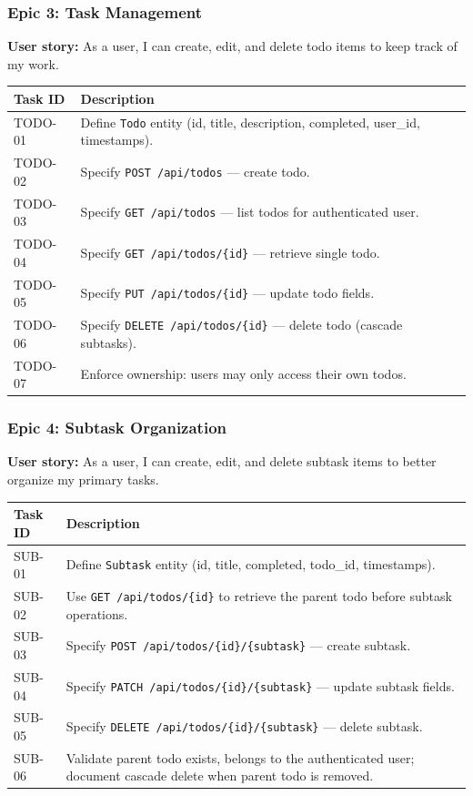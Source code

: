\subsubsection{Epic 3: Task Management}
\textbf{User story:} As a user, I can create, edit, and delete todo items to keep track of my work.

\begin{tabularx}{\textwidth}{@{} p{2.4cm} X @{}}
\toprule
\textbf{Task ID} & \textbf{Description} \\
\midrule
TODO-01 & Define \texttt{Todo} entity (id, title, description, completed, user\_id, timestamps). \\
TODO-02 & Specify \texttt{POST /api/todos} --- create todo. \\
TODO-03 & Specify \texttt{GET /api/todos} --- list todos for authenticated user. \\
TODO-04 & Specify \texttt{GET /api/todos/\{id\}} --- retrieve single todo. \\
TODO-05 & Specify \texttt{PUT /api/todos/\{id\}} --- update todo fields. \\
TODO-06 & Specify \texttt{DELETE /api/todos/\{id\}} --- delete todo (cascade subtasks). \\
TODO-07 & Enforce ownership: users may only access their own todos. \\
\bottomrule
\end{tabularx}

\subsubsection{Epic 4: Subtask Organization}
\textbf{User story:} As a user, I can create, edit, and delete subtask items to better organize my primary tasks.

\begin{tabularx}{\textwidth}{@{} p{2.4cm} X @{}}
\toprule
\textbf{Task ID} & \textbf{Description} \\
\midrule
SUB-01 & Define \texttt{Subtask} entity (id, title, completed, todo\_id, timestamps). \\
SUB-02 & Use \texttt{GET /api/todos/\{id\}} to retrieve the parent todo before subtask operations. \\
SUB-03 & Specify \texttt{POST /api/todos/\{id\}/\{subtask\}} --- create subtask. \\
SUB-04 & Specify \texttt{PATCH /api/todos/\{id\}/\{subtask\}} --- update subtask fields. \\
SUB-05 & Specify \texttt{DELETE /api/todos/\{id\}/\{subtask\}} --- delete subtask. \\
SUB-06 & Validate parent todo exists, belongs to the authenticated user; document cascade delete when parent todo is removed. \\
\bottomrule
\end{tabularx}




\newpage


